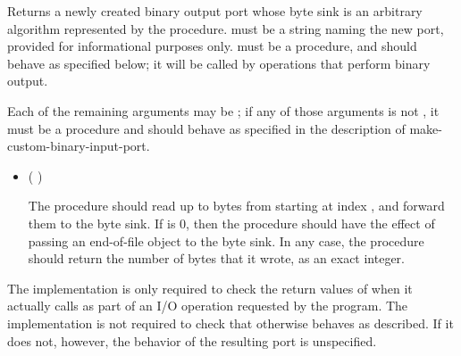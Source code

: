 \begin{entry}{%
}

Returns a newly created binary output port whose byte sink is
an arbitrary algorithm represented by the  procedure.
 must be a string naming the new port,
provided for informational purposes only.
 must be a procedure, and should behave as specified
below; it will be called by operations that perform binary output.

Each of the remaining arguments may be \schfalse{}; if any of
those arguments is not \schfalse{}, it must be a procedure and
should behave as specified in the description of
{\cf make-custom-binary-input-port}.
   
\begin{itemize}
\item {\cf (   )}
       
  The  procedure should read up to  bytes
  from  starting at index , and forward
  them to the byte sink.
  If  is 0, then the  procedure should
  have the effect of passing an end-of-file object to the byte sink.
  In any case, the  procedure should return the number of
  bytes that it wrote, as an exact integer.
\end{itemize}

\implresp The implementation is only required to check the return
values of  when it actually calls  as part of
an I/O operation requested by the program.  The implementation is not
required to check that  otherwise behaves as described.
If it does not, however, the behavior of the resulting port is
unspecified.
\end{entry}

